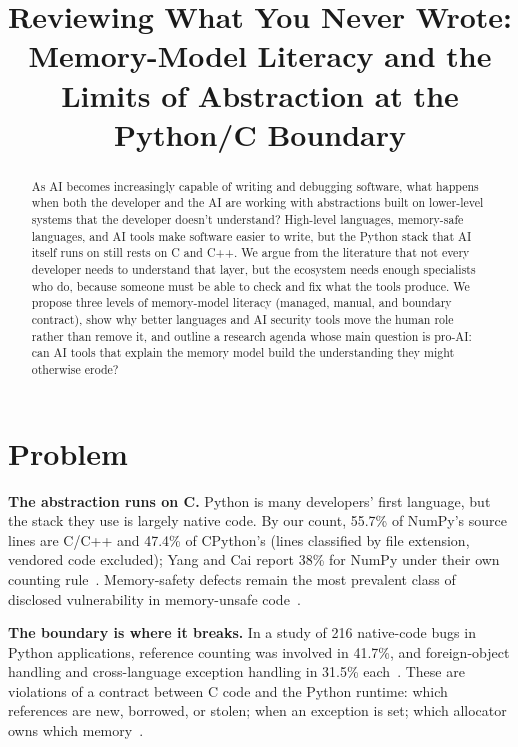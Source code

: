 \documentclass[conference]{IEEEtran}
\begin{document}
\title{Reviewing What You Never Wrote: Memory-Model Literacy and the Limits of Abstraction at the Python/C Boundary}

\author{
}

\maketitle

\begin{abstract}
As AI becomes increasingly capable of writing and debugging software, what happens when both the developer and the AI are working with abstractions built on lower-level systems that the developer doesn't understand? High-level languages, memory-safe languages, and AI tools make software easier to write, but the Python stack that AI itself runs on still rests on C and C++. We argue from the literature that not every developer needs to understand that layer, but the ecosystem needs enough specialists who do, because someone must be able to check and fix what the tools produce. We propose three levels of memory-model literacy (managed, manual, and boundary contract), show why better languages and AI security tools move the human role rather than remove it, and outline a research agenda whose main question is pro-AI: can AI tools that explain the memory model build the understanding they might otherwise erode?
\end{abstract}

\section{Problem}

\textbf{The abstraction runs on C.} Python is many developers' first language, but the stack they use is largely native code. By our count, 55.7\% of NumPy's source lines are C/C++ and 47.4\% of CPython's (lines classified by file extension, vendored code excluded); Yang and Cai report 38\% for NumPy under their own counting rule~\cite{yangcai2026}. Memory-safety defects remain the most prevalent class of disclosed vulnerability in memory-unsafe code~\cite{cisa2023}.

\textbf{The boundary is where it breaks.} In a study of 216 native-code bugs in Python applications, reference counting was involved in 41.7\%, and foreign-object handling and cross-language exception handling in 31.5\% each~\cite{yangcai2026}. These are violations of a contract between C code and the Python runtime: which references are new, borrowed, or stolen; when an exception is set; which allocator owns which memory~\cite{huzhang2023}.
\end{document}
